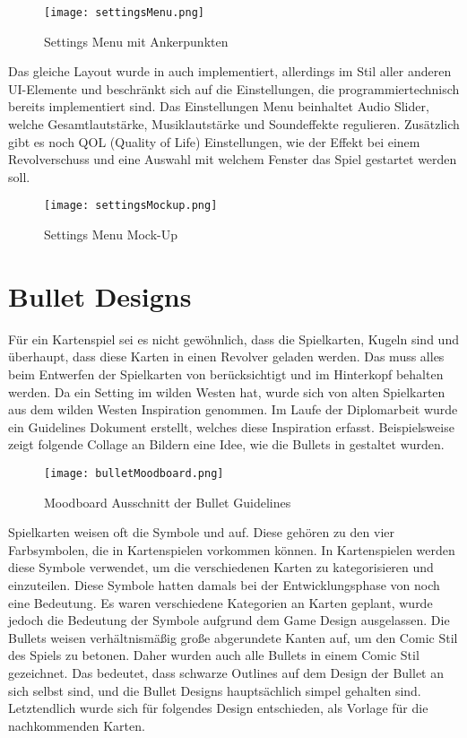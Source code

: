 \begin{figure}[H]
    \centering
    \texttt{[image: settingsMenu.png]}
    \caption{Settings Menu mit Ankerpunkten}
\end{figure}

Das gleiche Layout wurde in \FF auch implementiert, allerdings im Stil aller anderen UI-Elemente und beschränkt sich auf die Einstellungen, die programmiertechnisch bereits implementiert sind. Das Einstellungen Menu beinhaltet Audio Slider, welche Gesamtlautstärke, Musiklautstärke und Soundeffekte regulieren. Zusätzlich gibt es noch QOL (Quality of Life) Einstellungen, wie der  Effekt bei einem Revolverschuss und eine Auswahl mit welchem Fenster das Spiel gestartet werden soll.

\begin{figure}[H]
    \centering
    \texttt{[image: settingsMockup.png]}
    \caption{Settings Menu Mock-Up}
\end{figure}

\section{Bullet Designs}

Für ein Kartenspiel sei es nicht gewöhnlich, dass die Spielkarten, Kugeln sind und überhaupt, dass diese Karten in einen Revolver geladen werden. Das muss alles beim Entwerfen der Spielkarten von \FF berücksichtigt und im Hinterkopf behalten werden. Da \FF ein Setting im wilden Westen hat, wurde sich von alten Spielkarten aus dem wilden Westen Inspiration genommen. Im Laufe der Diplomarbeit wurde ein Guidelines Dokument erstellt, welches diese Inspiration erfasst. Beispielsweise zeigt folgende Collage an Bildern eine Idee, wie die Bullets in \FF gestaltet wurden.

\begin{figure}[H]
    \centering
    \texttt{[image: bulletMoodboard.png]}
    \caption{Moodboard Ausschnitt der Bullet Guidelines}
\end{figure}

Spielkarten weisen oft die Symbole  und  auf. Diese gehören zu den vier Farbsymbolen, die in Kartenspielen vorkommen können. In Kartenspielen werden diese Symbole verwendet, um die verschiedenen Karten zu kategorisieren und einzuteilen. Diese Symbole hatten damals bei der Entwicklungsphase von \FF noch eine Bedeutung. Es waren verschiedene Kategorien an Karten geplant, wurde jedoch die Bedeutung der Symbole aufgrund dem Game Design ausgelassen. Die Bullets weisen verhältnismäßig große abgerundete Kanten auf, um den Comic Stil des Spiels zu betonen. Daher wurden auch alle Bullets in einem Comic Stil gezeichnet. Das bedeutet, dass schwarze Outlines auf dem Design der Bullet an sich selbst sind, und die Bullet Designs hauptsächlich simpel gehalten sind. Letztendlich wurde sich für folgendes Design entschieden, als Vorlage für die nachkommenden Karten.

